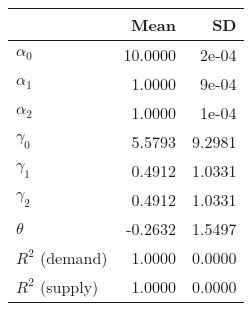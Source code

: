 
\begin{tabular}[t]{lrr}
\toprule
  & Mean & SD\\
\midrule
$\alpha_{0}$ & 10.0000 & 2e-04\\
$\alpha_{1}$ & 1.0000 & 9e-04\\
$\alpha_{2}$ & 1.0000 & 1e-04\\
$\gamma_{0}$ & 5.5793 & 9.2981\\
$\gamma_{1}$ & 0.4912 & 1.0331\\
$\gamma_{2}$ & 0.4912 & 1.0331\\
$\theta$ & -0.2632 & 1.5497\\
$R^{2}$ (demand) & 1.0000 & 0.0000\\
$R^{2}$ (supply) & 1.0000 & 0.0000\\
\bottomrule
\end{tabular}
